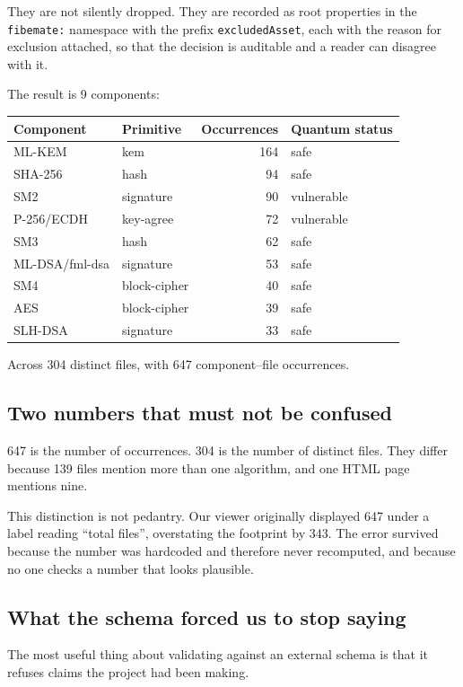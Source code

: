 They are not silently dropped. They are recorded as root properties in the
\texttt{fibemate:} namespace with the prefix \texttt{excludedAsset}, each with
the reason for exclusion attached, so that the decision is auditable and a
reader can disagree with it.

The result is 9 components:

\begin{center}
\begin{tabular}{@{}llrl@{}}
\toprule
Component & Primitive & Occurrences & Quantum status \\
\midrule
ML-KEM & kem & 164 & safe \\
SHA-256 & hash & 94 & safe \\
SM2 & signature & 90 & vulnerable \\
P-256/ECDH & key-agree & 72 & vulnerable \\
SM3 & hash & 62 & safe \\
ML-DSA/fml-dsa & signature & 53 & safe \\
SM4 & block-cipher & 40 & safe \\
AES & block-cipher & 39 & safe \\
SLH-DSA & signature & 33 & safe \\
\bottomrule
\end{tabular}
\end{center}

Across 304 distinct files, with 647 component--file occurrences.

\subsection{Two numbers that must not be confused}

647 is the number of occurrences. 304 is the number of distinct files. They
differ because 139 files mention more than one algorithm, and one HTML page
mentions nine.

This distinction is not pedantry. Our viewer originally displayed 647 under a
label reading ``total files'', overstating the footprint by 343. The error
survived because the number was hardcoded and therefore never recomputed, and
because no one checks a number that looks plausible.

\subsection{What the schema forced us to stop saying}

The most useful thing about validating against an external schema is that it
refuses claims the project had been making.

